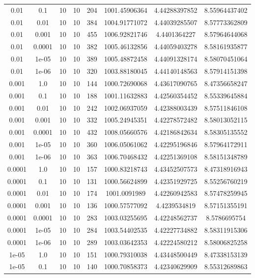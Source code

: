 \documentclass[11pt,a4paper]{article}
\begin{document}
\begin{table}
{\begin{tabular}{*{8}c}
 0.01 & 0.1 &10 &10 & 204& 1001.45906364 & 4.44288397852 & 8.55964437402 \\
 0.01 & 0.01 &10 &10 & 384& 1004.91771072 & 4.44039285507 & 8.57773362809 \\
 0.01 & 0.001 &10 &10 & 455& 1006.92821746 & 4.4401364227 & 8.57964644068 \\
 0.01 & 0.0001 &10 &10 & 382& 1005.46132856 & 4.44059403278 & 8.58161935877 \\
 0.01 & 1e-05 &10 &10 & 389& 1005.48872458 & 4.44091328174 & 8.58070451064 \\
 0.01 & 1e-06 &10 &10 & 320& 1003.88180045 & 4.44140148563 & 8.57914151398 \\
 0.001 & 1.0 &10 &10 & 144& 1000.72690068 & 4.43617090765 & 8.47356658247 \\
 0.001 & 0.1 &10 &10 & 188& 1001.11632883 & 4.42560354452 & 8.55339645884 \\
 0.001 & 0.01 &10 &10 & 242& 1002.06937059 & 4.42388003439 & 8.57511846108 \\
 0.001 & 0.001 &10 &10 & 332& 1005.24945351 & 4.42278572482 & 8.58013052115 \\
 0.001 & 0.0001 &10 &10 & 432& 1008.05660576 & 4.42186842634 & 8.58305135552 \\
 0.001 & 1e-05 &10 &10 & 360& 1006.05061062 & 4.42295196846 & 8.57964172911 \\
 0.001 & 1e-06 &10 &10 & 363& 1006.70468432 & 4.42251369108 & 8.58151348789 \\
 0.0001 & 1.0 &10 &10 & 157& 1000.83218743 & 4.43452507573 & 8.47318916943 \\
 0.0001 & 0.1 &10 &10 & 131& 1000.56624899 & 4.42351929725 & 8.55256760219 \\
 0.0001 & 0.01 &10 &10 & 174& 1001.0091989 & 4.42260942583 & 8.57478259945 \\
 0.0001 & 0.001 &10 &10 & 136& 1000.57577092 & 4.4239534819 & 8.57151355191 \\
 0.0001 & 0.0001 &10 &10 & 283& 1003.03255695 & 4.42248562737 & 8.5786695754 \\
 0.0001 & 1e-05 &10 &10 & 284& 1003.54402535 & 4.42227734882 & 8.58311915306 \\
 0.0001 & 1e-06 &10 &10 & 289& 1003.03642353 & 4.42224580212 & 8.58006825258 \\
 1e-05 & 1.0 &10 &10 & 151& 1000.79310038 & 4.43448500449 & 8.47338153139 \\
 1e-05 & 0.1 &10 &10 & 140& 1000.70858373 & 4.42340629909 & 8.55312689863 \\

\end{tabular}}
\end{table}
\end{document}
